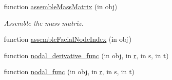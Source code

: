\begin{DoxyCompactItemize}
function \hyperlink{class_std_cell_ab1f5e5bd640dd798a3a2253c68258832}{assemble\+Mass\+Matrix} (in obj)
\begin{DoxyCompactList}\small\item\em Assemble the mass matrix. \end{DoxyCompactList}\item 
function \hyperlink{class_std_cell_ae5209767d407f90619d3585003d72b79}{assemble\+Facial\+Node\+Index} (in obj)
\item 
function \hyperlink{class_std_cell_a73be59748210a94436f7061207794e25}{nodal\+\_\+derivative\+\_\+func} (in obj, in \hyperlink{class_std_cell_a737dd2feb25f74be0215a594334ec622}{r}, in s, in t)
\item 
function \hyperlink{class_std_cell_acad53d6f288d6e8982e87ffc0efcc8b1}{nodal\+\_\+func} (in obj, in \hyperlink{class_std_cell_a737dd2feb25f74be0215a594334ec622}{r}, in s, in t)
\end{DoxyCompactItemize}
